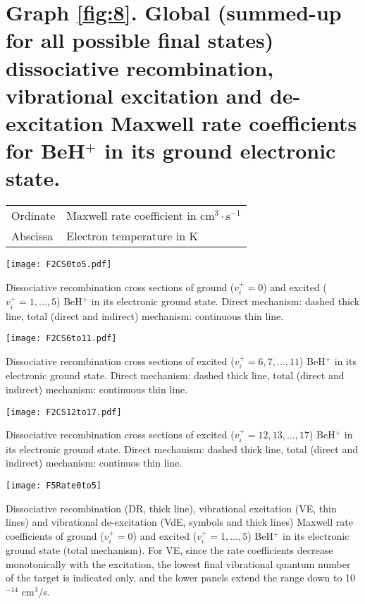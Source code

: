 \documentclass[reviewcopy]{elsarticle}
\begin{document}
\section*{Graph \ref{fig:8}. Global (summed-up for all possible final states) dissociative recombination, vibrational excitation and de-excitation  Maxwell rate coefficients for BeH$^+$ in its ground electronic state.}
\begin{tabular}{@{}p{2in}p{6in}@{}}
Ordinate		& Maxwell rate coefficient in cm$^3\cdot$s$^{-1}$ \\
Abscissa	& Electron temperature in K\\
\end{tabular}

\newpage


 \begin{Dfigures}[h]%
\texttt{[image: F2CS0to5.pdf]} 
\caption{\label{fig:2}  Dissociative recombination cross sections of ground ($v_{i}^{+}=0$) and excited ($v_{i}^{+}=1,...,5$) {\rm BeH$^{+}$} in its electronic ground state. Direct mechanism: dashed thick line, total (direct and indirect) mechanism: continuous thin line.}
\end{Dfigures}

\clearpage

 \begin{Dfigures}[h]%
    \texttt{[image: F2CS6to11.pdf]}     
     \caption{\label{fig:3} Dissociative recombination cross sections of excited ($v_{i}^{+}=6,7,...,11$) {\rm BeH$^{+}$} in its electronic ground state. Direct mechanism: dashed thick line, total (direct and indirect) mechanism: continuous thin line.}
\end{Dfigures}

\clearpage

\begin{Dfigures}[h]%
\texttt{[image: F2CS12to17.pdf]} 
\caption{\label{fig:4} Dissociative recombination cross sections of excited ($v_{i}^{+}=12,13,...,17$) {\rm BeH$^{+}$} in its electronic ground state. Direct mechanism: dashed thick line, total (direct and indirect) mechanism: continuos thin line.
}
\end{Dfigures}

\clearpage

 \begin{Dfigures}[h]%
\texttt{[image: F5Rate0to5]} 
\caption{\label{fig:5} Dissociative recombination (DR, thick line), vibrational excitation (VE, thin lines) and vibrational de-excitation (VdE, symbols and thick lines) Maxwell rate coefficients of ground ($v_{i}^{+}=0$) and excited ($v_{i}^{+}=1,...,5$) {\rm BeH$^{+}$} in its electronic ground state (total mechanism). For VE, since the rate coefficients decrease monotonically with the excitation, the lowest final vibrational quantum number of the target is indicated only, and the lower panels extend the range down to \rm{10$^{-14}$ cm$^3$/s}.}
\end{Dfigures}
\end{document}
